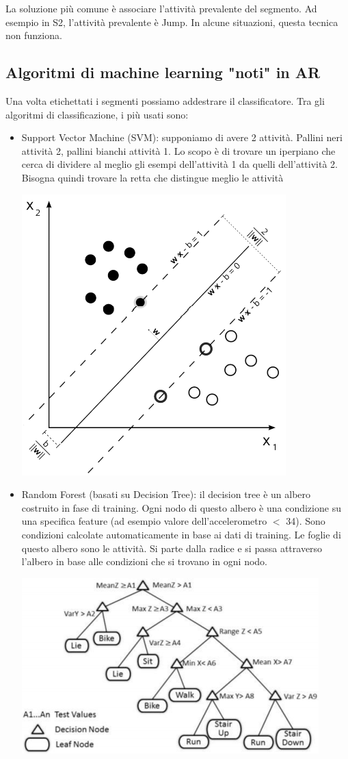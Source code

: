 La soluzione più comune è associare l'attività prevalente del segmento. Ad esempio in S2, l'attività prevalente è Jump. In alcune situazioni, questa tecnica non funziona.

\subsection{Algoritmi di machine learning "noti" in AR}
Una volta etichettati i segmenti possiamo addestrare il classificatore. 
Tra gli algoritmi di classificazione, i più usati sono:
\begin{itemize}
    \item Support Vector Machine (SVM): supponiamo di avere 2 attività. Pallini neri attività 2, pallini bianchi attività 1. Lo scopo è di trovare un iperpiano che cerca di dividere al meglio gli esempi dell'attività 1 da quelli dell'attività 2.
    Bisogna quindi trovare la retta che distingue meglio le attività
    \begin{center}
        \includegraphics[width=.4\textwidth]{images/MobiDEV/6. activity recognition/svm.PNG}
    \end{center}
    \item Random Forest (basati su Decision Tree): il decision tree è un albero costruito in fase di training. Ogni nodo di questo albero è una condizione su una specifica feature (ad esempio valore dell'accelerometro $<$ 34). 
    Sono condizioni calcolate automaticamente in base ai dati di training. Le foglie di questo albero sono le attività. Si parte dalla radice e si passa attraverso l'albero in base alle condizioni che si trovano in ogni nodo.
    \begin{center}
        \includegraphics[width=.7\textwidth]{images/MobiDEV/6. activity recognition/decision tree.PNG}

\end{center}
\end{itemize}
